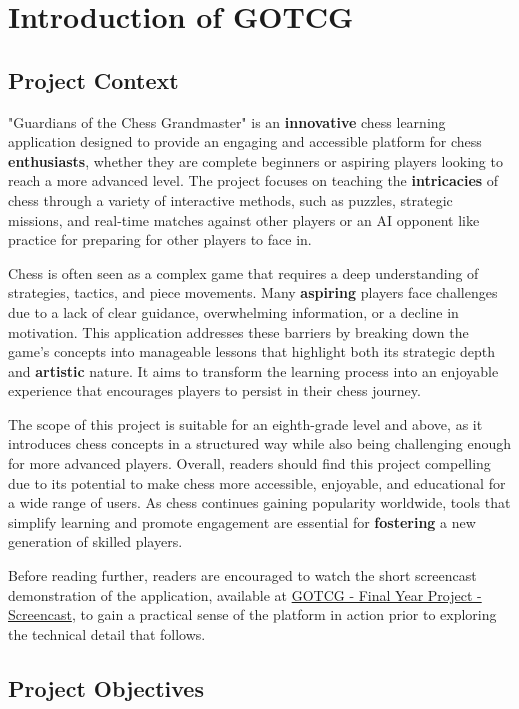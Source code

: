 \chapter{Introduction of GOTCG}
\label{cha:introduction}
\section{Project Context}

"Guardians of the Chess Grandmaster" is an \textbf{innovative} chess learning application designed to provide an engaging and accessible platform for chess \textbf{enthusiasts}, whether they are complete beginners or aspiring players looking to reach a more advanced level. The project focuses on teaching the \textbf{intricacies} of chess through a variety of interactive methods, such as puzzles, strategic missions, and real-time matches against other players or an AI opponent like practice for preparing for other players to face in.

Chess is often seen as a complex game that requires a deep understanding of strategies, tactics, and piece movements. Many \textbf{aspiring} players face challenges due to a lack of clear guidance, overwhelming information, or a decline in motivation. This application addresses these barriers by breaking down the game's concepts into manageable lessons that highlight both its strategic depth and \textbf{artistic} nature. It aims to transform the learning process into an enjoyable experience that encourages players to persist in their chess journey.

The scope of this project is suitable for an eighth-grade level and above, as it introduces chess concepts in a structured way while also being challenging enough for more advanced players. Overall, readers should find this project compelling due to its potential to make chess more accessible, enjoyable, and educational for a wide range of users. As chess continues gaining popularity worldwide, tools that simplify learning and promote engagement are essential for \textbf{fostering} a new generation of skilled players.

Before reading further, readers are encouraged to watch the short screencast demonstration of the application, available at \href{https://youtu.be/7gg2fioyUZk}{GOTCG - Final Year Project - Screencast}, to gain a practical sense of the platform in action prior to exploring the technical detail that follows.

\section{Project Objectives}

